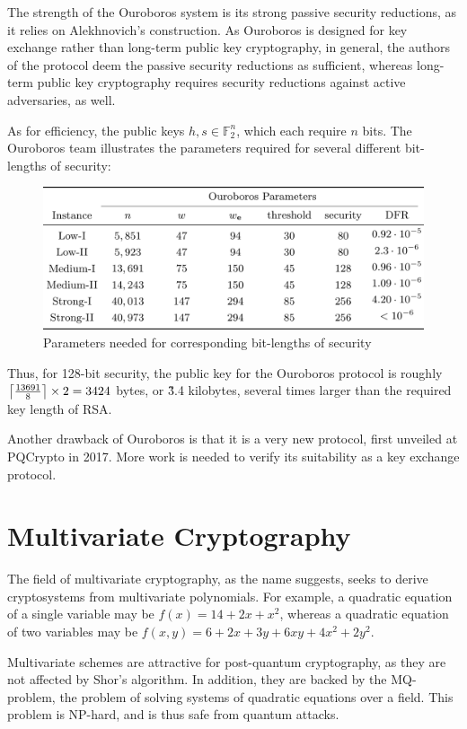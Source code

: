\documentclass{article}
\DeclarePairedDelimiter{\ceil}{\lceil}{\rceil}
\begin{document}
The strength of the Ouroboros system is its strong passive security reductions, as it relies on Alekhnovich's construction. As Ouroboros is designed for key exchange rather than long-term public key cryptography, in general, the authors of the protocol deem the passive security reductions as sufficient, whereas long-term public key cryptography requires security reductions against active adversaries, as well.\cite{deneuville17}

As for efficiency, the public keys $ h, s \in \mathbb{F}^n_2 $, which each require $ n $ bits. The Ouroboros team illustrates the parameters required for several different bit-lengths of security:

\begin{figure}[h!]
	\centering
	\includegraphics[width=120mm]{ouroboros_parameters.png}
	\caption{Parameters needed for corresponding bit-lengths of security\cite{deneuville17}}
\end{figure}

Thus, for 128-bit security, the public key for the Ouroboros protocol is roughly $ \ceil*{\frac {13691} {8}} \times 2 = 3424 $ bytes, or \~3.4 kilobytes, several times larger than the required key length of RSA.

Another drawback of Ouroboros is that it is a very new protocol, first unveiled at PQCrypto in 2017. More work is needed to verify its suitability as a key exchange protocol.

\section{Multivariate Cryptography}

The field of multivariate cryptography, as the name suggests, seeks to derive cryptosystems from multivariate polynomials. For example, a quadratic equation of a single variable may be $ f(x) = 14 + 2 x + x^2 $, whereas a quadratic equation of two variables may be $ f(x, y) = 6 + 2 x + 3 y + 6 x y + 4 x^2 + 2 y^2 $.

Multivariate schemes are attractive for post-quantum cryptography, as they are not affected by Shor's algorithm. In addition, they are backed by the MQ-problem, the problem of solving systems of quadratic equations over a field. This problem is NP-hard, and is thus safe from quantum attacks.\cite{cartor17eflash}
\end{document}
